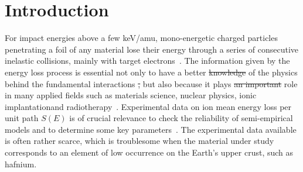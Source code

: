 \documentclass[aps,pra,reprint,superscriptaddress]{revtex4-1} %
\providecommand{\DIFadd}[1]{{\protect\color{blue}\uwave{#1}}} %
\providecommand{\DIFdel}[1]{{\protect\color{red}\sout{#1}}}                      %
\providecommand{\DIFaddbegin}{} %
\providecommand{\DIFaddend}{} %
\providecommand{\DIFdelbegin}{} %
\providecommand{\DIFdelend}{} %
\newcommand{\DIFscaledelfig}{0.5}
\newlength{\DIFdelgraphicswidth} %
\newlength{\DIFdelgraphicsheight} %
\newcommand{\DIFaddincludegraphics}[2][]{{\color{blue}\fbox{\DIFOincludegraphics[#1]{#2}}}} %
\newcommand{\DIFdelincludegraphics}[2][]{%
\sbox{\DIFdelgraphicsbox}{\DIFOincludegraphics[#1]{#2}}%
\settoboxwidth{\DIFdelgraphicswidth}{\DIFdelgraphicsbox} %
\settoboxtotalheight{\DIFdelgraphicsheight}{\DIFdelgraphicsbox} %
\scalebox{\DIFscaledelfig}{%
\parbox[b]{\DIFdelgraphicswidth}{\usebox{\DIFdelgraphicsbox}\\[-\baselineskip] \rule{\DIFdelgraphicswidth}{0em}}\llap{\resizebox{\DIFdelgraphicswidth}{\DIFdelgraphicsheight}{%
\setlength{\unitlength}{\DIFdelgraphicswidth}%
\begin{picture}(1,1)%
\thicklines\linethickness{2pt} %
{\color[rgb]{1,0,0}\put(0,0){\framebox(1,1){}}}%
{\color[rgb]{1,0,0}\put(0,0){\line( 1,1){1}}}%
{\color[rgb]{1,0,0}\put(0,1){\line(1,-1){1}}}%
\end{picture}%
}\hspace*{3pt}}} %
} %
\DeclareRobustCommand{\DIFaddbegin}{\DIFOaddbegin \let\includegraphics\DIFaddincludegraphics} %
\DeclareRobustCommand{\DIFaddend}{\DIFOaddend \let\includegraphics\DIFOincludegraphics} %
\DeclareRobustCommand{\DIFdelbegin}{\DIFOdelbegin \let\includegraphics\DIFdelincludegraphics} %
\DeclareRobustCommand{\DIFdelend}{\DIFOaddend \let\includegraphics\DIFOincludegraphics} %
\begin{document}
\maketitle

\DIFaddbegin \linenumbers
\DIFaddend \section{Introduction}
\label{intro}

For impact energies above a few keV/amu, mono-energetic charged 
particles penetrating a foil of any material lose their energy through 
a series of consecutive inelastic collisions, mainly with target 
electrons~\cite{Chu01,Sigmund}. The information given by the energy 
loss process is essential not only to have a better \DIFdelbegin \DIFdel{knowledge }\DIFdelend \DIFaddbegin \DIFadd{comprehension }\DIFaddend of the 
physics behind the fundamental interactions \DIFdelbegin \DIFdel{, }\DIFdelend but also because it plays 
\DIFdelbegin \DIFdel{an important }\DIFdelend \DIFaddbegin \DIFadd{a vital }\DIFaddend role in many applied fields such as materials science, 
nuclear physics, ionic implantation\DIFaddbegin \DIFadd{, }\DIFaddend and radiotherapy~\cite{Sigmund,Schardt}. 
Experimental data on ion mean energy loss per unit path $S(E)$ is of 
crucial relevance to check the reliability of semi-empirical models and 
to determine some key parameters~\cite{Diwan,Damache04,Damache02}. The 
experimental data available is often rather scarce, which is troublesome 
when the material under study corresponds to an element of low 
occurrence on the Earth's upper crust, such as hafnium.
\end{document}
